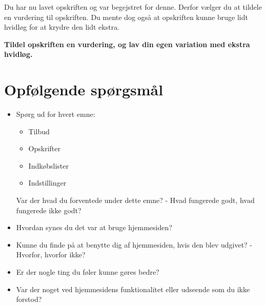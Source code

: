 Du har nu lavet opskriften og var begejstret for denne. Derfor vælger du at tildele en vurdering til opskriften.
Du mente dog også at opskriften kunne bruge lidt hvidløg for at krydre den lidt ekstra. 

\textbf{Tildel opskriften en vurdering, og lav din egen variation med ekstra hvidløg.}


\section{Opfølgende spørgsmål}

\begin{itemize}
	\item Spørg ud for hvert emne:
		\begin{itemize}
			\item Tilbud
			\item Opskrifter
			\item Indkøbslister
			\item Indstillinger
		\end{itemize}
	Var der hvad du forventede under dette emne? - Hvad fungerede godt, hvad fungerede ikke godt?
	\item Hvordan synes du det var at bruge hjemmesiden?
	\item Kunne du finde på at benytte dig af hjemmesiden, hvis den blev udgivet? - Hvorfor, hvorfor ikke?
	\item Er der nogle ting du føler kunne gøres bedre?
	\item Var der noget ved hjemmesidens funktionalitet eller udseende som du ikke forstod?
\end{itemize}
